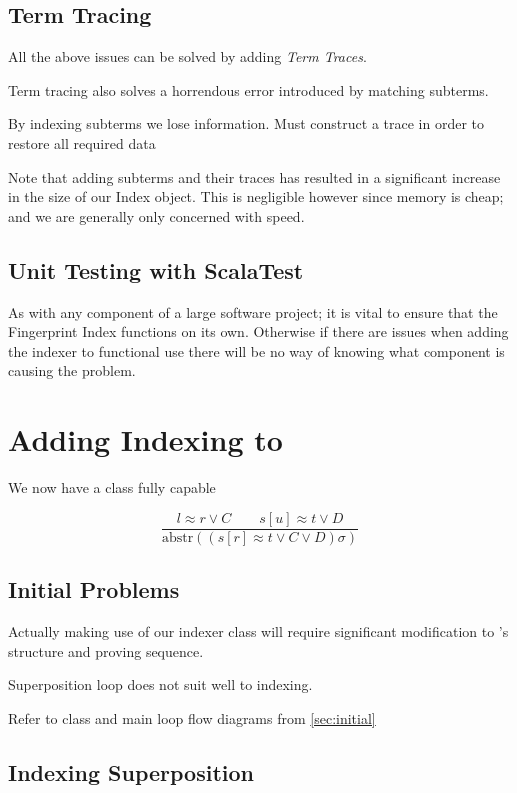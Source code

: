 \subsection{Term Tracing}

All the above issues can be solved by adding \emph{Term Traces}.

Term tracing also solves a horrendous error introduced by matching subterms. 

By indexing subterms we lose information. Must construct a trace in order
to restore all required data

Note that adding subterms and their traces has resulted in a significant increase in the
size of our Index object. This is negligible however since memory is cheap; and we are
generally only concerned with speed.

\subsection{Unit Testing with ScalaTest}

As with any component of a large software project; it is vital to ensure that the
Fingerprint Index functions on its own. Otherwise if there are issues when adding
the indexer to functional use there will be no way of knowing what component is
causing the problem.


\section{Adding Indexing to \Beagle}
We now have a class fully capable 

\[ \frac{l \approx r \lor C\quad \quad s[u] \approx t \lor D}{\text{abstr}((s[r] \approx t \lor C \lor D)\sigma)} \]


\subsection{Initial Problems}

Actually making use of our indexer class will require significant modification
to \beagle's structure and proving sequence.

Superposition loop does not suit well to indexing. 

Refer to class and main loop flow diagrams from \ref{sec:initial}

\subsection{Indexing Superposition}


